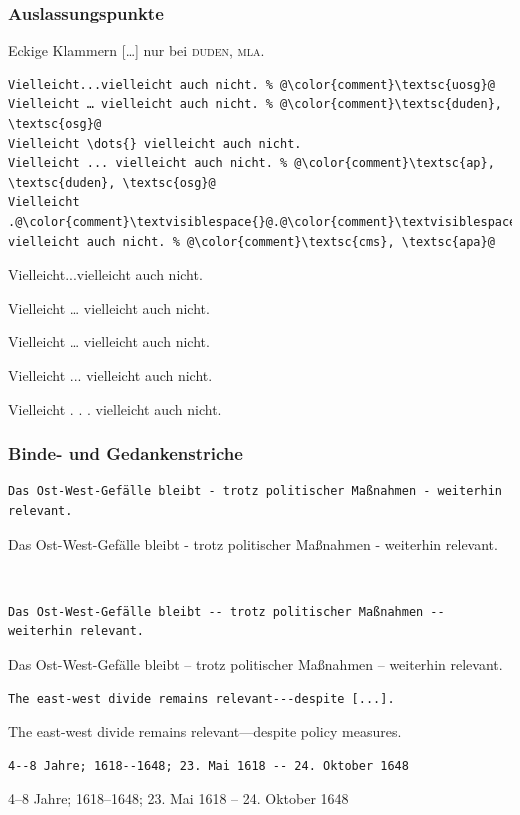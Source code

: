 \documentclass{beamer}
\begin{document}
\begin{frame}[fragile]
    \frametitle{Auslassungspunkte}
    Eckige Klammern [\dots{}] nur bei \textsc{duden}, \textsc{mla}.

    \pause

    \begin{lstlisting}[escapechar=\@]
Vielleicht...vielleicht auch nicht. % @\color{comment}\textsc{uosg}@
Vielleicht … vielleicht auch nicht. % @\color{comment}\textsc{duden}, \textsc{osg}@
Vielleicht \dots{} vielleicht auch nicht.
Vielleicht ... vielleicht auch nicht. % @\color{comment}\textsc{ap}, \textsc{duden}, \textsc{osg}@
Vielleicht .@\color{comment}\textvisiblespace{}@.@\color{comment}\textvisiblespace{}@. vielleicht auch nicht. % @\color{comment}\textsc{cms}, \textsc{apa}@
        \end{lstlisting}

    Vielleicht...vielleicht auch nicht.

    Vielleicht … vielleicht auch nicht.

    Vielleicht \dots{} vielleicht auch nicht.

    Vielleicht ... vielleicht auch nicht.

    Vielleicht . . . vielleicht auch nicht.\\[2ex]
\end{frame}

\begin{frame}[fragile]
    \frametitle{Binde- und Gedankenstriche}%
    \begin{wrong}
        \begin{lstlisting}
Das Ost-West-Gefälle bleibt - trotz politischer Maßnahmen - weiterhin relevant.
        \end{lstlisting}
        Das Ost-West-Gefälle bleibt - trotz politischer Maßnahmen - weiterhin relevant.
    \end{wrong}\\[2ex]\pause

    \begin{lstlisting}
Das Ost-West-Gefälle bleibt -- trotz politischer Maßnahmen -- weiterhin relevant.
    \end{lstlisting}
    Das Ost-West-Gefälle bleibt -- trotz politischer Maßnahmen -- weiterhin relevant.\\[2ex]\pause

    \begin{lstlisting}
The east-west divide remains relevant---despite [...].
    \end{lstlisting}
    The east-west divide remains relevant---despite policy measures.\\[2ex]
    \pause

    \begin{lstlisting}
4--8 Jahre; 1618--1648; 23. Mai 1618 -- 24. Oktober 1648
    \end{lstlisting}
    4--8 Jahre; 1618--1648; 23. Mai 1618 -- 24. Oktober 1648
\end{frame}
\end{document}

